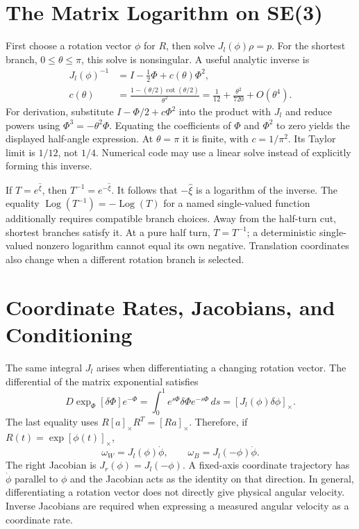 \section{The Matrix Logarithm on SE(3)}
\label{sec:matrix_log_se3}

First choose a rotation vector $\phi$ for $R$, then solve $J_l(\phi)\rho=p$. For the shortest branch, $0\leq\theta\leq\pi$, this solve is nonsingular. A useful analytic inverse is
\begin{equation}
 \begin{aligned}
 J_l(\phi)^{-1}&=I-\tfrac12\Phi+c(\theta)\Phi^2,\\
 c(\theta)&=\frac{1-(\theta/2)\cot(\theta/2)}{\theta^2}
 =\frac1{12}+\frac{\theta^2}{720}+O(\theta^4).
 \end{aligned}
 \label{eq:exponential_jacobian_inverse}
\end{equation}
For derivation, substitute $I-\Phi/2+c\Phi^2$ into the product with $J_l$ and reduce powers using $\Phi^3=-\theta^2\Phi$. Equating the coefficients of $\Phi$ and $\Phi^2$ to zero yields the displayed half-angle expression. At $\theta=\pi$ it is finite, with $c=1/\pi^2$. Its Taylor limit is $1/12$, not $1/4$. Numerical code may use a linear solve instead of explicitly forming this inverse.

If $T=e^{\widehat\xi}$, then $T^{-1}=e^{-\widehat\xi}$. It follows that $-\widehat\xi$ is a logarithm of the inverse. The equality $\operatorname{Log}(T^{-1})=-\operatorname{Log}(T)$ for a named single-valued function additionally requires compatible branch choices. Away from the half-turn cut, shortest branches satisfy it. At a pure half turn, $T=T^{-1}$; a deterministic single-valued nonzero logarithm cannot equal its own negative. Translation coordinates also change when a different rotation branch is selected.

\section{Coordinate Rates, Jacobians, and Conditioning}
\label{sec:exponential_differential}

The same integral $J_l$ arises when differentiating a changing rotation vector. The differential of the matrix exponential satisfies
\begin{equation}
 D\exp_\Phi[\delta\Phi]e^{-\Phi}
 =\int_0^1 e^{s\Phi}\delta\Phi e^{-s\Phi}\,ds
 =[J_l(\phi)\delta\phi]_\times.
 \label{eq:exponential_dexp}
\end{equation}
The last equality uses $R[a]_\times R^T=[Ra]_\times$. Therefore, if $R(t)=\exp[\phi(t)]_\times$,
\begin{equation}
 \omega_W=J_l(\phi)\dot\phi,\qquad
 \omega_B=J_l(-\phi)\dot\phi.
 \label{eq:exponential_coordinate_rates}
\end{equation}
The right Jacobian is $J_r(\phi)=J_l(-\phi)$. A fixed-axis coordinate trajectory has $\dot\phi$ parallel to $\phi$ and the Jacobian acts as the identity on that direction. In general, differentiating a rotation vector does not directly give physical angular velocity. Inverse Jacobians are required when expressing a measured angular velocity as a coordinate rate.

